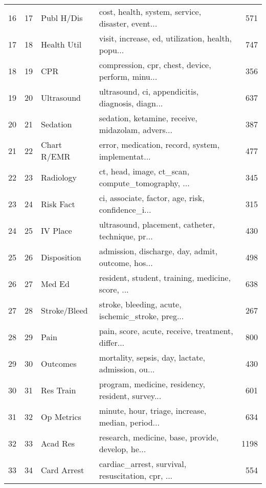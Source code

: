 \begin{tabular}{rrllr}
         16 &     17 &    Publ H/Dis &  cost, health, system, service, disaster, event... &             571 \\
         17 &     18 &   Health Util &  visit, increase, ed, utilization, health, popu... &             747 \\
         18 &     19 &           CPR &  compression, cpr, chest, device, perform, minu... &             356 \\
         19 &     20 &    Ultrasound &  ultrasound, ci, appendicitis, diagnosis, diagn... &             637 \\
         20 &     21 &      Sedation &  sedation, ketamine, receive, midazolam, advers... &             387 \\
         21 &     22 &   Chart R/EMR &  error, medication, record, system, implementat... &             477 \\
         22 &     23 &     Radiology &  ct, head, image, ct\_scan, compute\_tomography, ... &             345 \\
         23 &     24 &     Risk Fact &  ci, associate, factor, age, risk, confidence\_i... &             315 \\
         24 &     25 &      IV Place &  ultrasound, placement, catheter, technique, pr... &             430 \\
         25 &     26 &   Disposition &  admission, discharge, day, admit, outcome, hos... &             498 \\
         26 &     27 &        Med Ed &  resident, student, training, medicine, score, ... &             638 \\
         27 &     28 &  Stroke/Bleed &  stroke, bleeding, acute, ischemic\_stroke, preg... &             267 \\
         28 &     29 &          Pain &  pain, score, acute, receive, treatment, differ... &             800 \\
         29 &     30 &      Outcomes &  mortality, sepsis, day, lactate, admission, ou... &             430 \\
         30 &     31 &     Res Train &  program, medicine, residency, resident, survey... &             601 \\
         31 &     32 &    Op Metrics &  minute, hour, triage, increase, median, period... &             634 \\
         32 &     33 &      Acad Res &  research, medicine, base, provide, develop, he... &            1198 \\
         33 &     34 &   Card Arrest &  cardiac\_arrest, survival, resuscitation, cpr, ... &             554 \\

\end{tabular}
